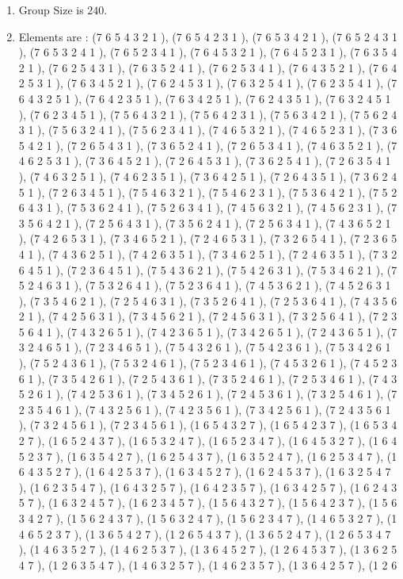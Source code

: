 \documentclass[12pt]{article}
\begin{document}
\begin{enumerate}
\item Group Size is $240$.
\item Elements are : (7 6 5 4 3 2 1  ), (7 6 5 4 2 3 1  ), (7 6 5 3 4 2 1  ), (7 6 5 2 4 3 1  ), (7 6 5 3 2 4 1  ), (7 6 5 2 3 4 1  ), (7 6 4 5 3 2 1  ), (7 6 4 5 2 3 1  ), (7 6 3 5 4 2 1  ), (7 6 2 5 4 3 1  ), (7 6 3 5 2 4 1  ), (7 6 2 5 3 4 1  ), (7 6 4 3 5 2 1  ), (7 6 4 2 5 3 1  ), (7 6 3 4 5 2 1  ), (7 6 2 4 5 3 1  ), (7 6 3 2 5 4 1  ), (7 6 2 3 5 4 1  ), (7 6 4 3 2 5 1  ), (7 6 4 2 3 5 1  ), (7 6 3 4 2 5 1  ), (7 6 2 4 3 5 1  ), (7 6 3 2 4 5 1  ), (7 6 2 3 4 5 1  ), (7 5 6 4 3 2 1  ), (7 5 6 4 2 3 1  ), (7 5 6 3 4 2 1  ), (7 5 6 2 4 3 1  ), (7 5 6 3 2 4 1  ), (7 5 6 2 3 4 1  ), (7 4 6 5 3 2 1  ), (7 4 6 5 2 3 1  ), (7 3 6 5 4 2 1  ), (7 2 6 5 4 3 1  ), (7 3 6 5 2 4 1  ), (7 2 6 5 3 4 1  ), (7 4 6 3 5 2 1  ), (7 4 6 2 5 3 1  ), (7 3 6 4 5 2 1  ), (7 2 6 4 5 3 1  ), (7 3 6 2 5 4 1  ), (7 2 6 3 5 4 1  ), (7 4 6 3 2 5 1  ), (7 4 6 2 3 5 1  ), (7 3 6 4 2 5 1  ), (7 2 6 4 3 5 1  ), (7 3 6 2 4 5 1  ), (7 2 6 3 4 5 1  ), (7 5 4 6 3 2 1  ), (7 5 4 6 2 3 1  ), (7 5 3 6 4 2 1  ), (7 5 2 6 4 3 1  ), (7 5 3 6 2 4 1  ), (7 5 2 6 3 4 1  ), (7 4 5 6 3 2 1  ), (7 4 5 6 2 3 1  ), (7 3 5 6 4 2 1  ), (7 2 5 6 4 3 1  ), (7 3 5 6 2 4 1  ), (7 2 5 6 3 4 1  ), (7 4 3 6 5 2 1  ), (7 4 2 6 5 3 1  ), (7 3 4 6 5 2 1  ), (7 2 4 6 5 3 1  ), (7 3 2 6 5 4 1  ), (7 2 3 6 5 4 1  ), (7 4 3 6 2 5 1  ), (7 4 2 6 3 5 1  ), (7 3 4 6 2 5 1  ), (7 2 4 6 3 5 1  ), (7 3 2 6 4 5 1  ), (7 2 3 6 4 5 1  ), (7 5 4 3 6 2 1  ), (7 5 4 2 6 3 1  ), (7 5 3 4 6 2 1  ), (7 5 2 4 6 3 1  ), (7 5 3 2 6 4 1  ), (7 5 2 3 6 4 1  ), (7 4 5 3 6 2 1  ), (7 4 5 2 6 3 1  ), (7 3 5 4 6 2 1  ), (7 2 5 4 6 3 1  ), (7 3 5 2 6 4 1  ), (7 2 5 3 6 4 1  ), (7 4 3 5 6 2 1  ), (7 4 2 5 6 3 1  ), (7 3 4 5 6 2 1  ), (7 2 4 5 6 3 1  ), (7 3 2 5 6 4 1  ), (7 2 3 5 6 4 1  ), (7 4 3 2 6 5 1  ), (7 4 2 3 6 5 1  ), (7 3 4 2 6 5 1  ), (7 2 4 3 6 5 1  ), (7 3 2 4 6 5 1  ), (7 2 3 4 6 5 1  ), (7 5 4 3 2 6 1  ), (7 5 4 2 3 6 1  ), (7 5 3 4 2 6 1  ), (7 5 2 4 3 6 1  ), (7 5 3 2 4 6 1  ), (7 5 2 3 4 6 1  ), (7 4 5 3 2 6 1  ), (7 4 5 2 3 6 1  ), (7 3 5 4 2 6 1  ), (7 2 5 4 3 6 1  ), (7 3 5 2 4 6 1  ), (7 2 5 3 4 6 1  ), (7 4 3 5 2 6 1  ), (7 4 2 5 3 6 1  ), (7 3 4 5 2 6 1  ), (7 2 4 5 3 6 1  ), (7 3 2 5 4 6 1  ), (7 2 3 5 4 6 1  ), (7 4 3 2 5 6 1  ), (7 4 2 3 5 6 1  ), (7 3 4 2 5 6 1  ), (7 2 4 3 5 6 1  ), (7 3 2 4 5 6 1  ), (7 2 3 4 5 6 1  ), (1 6 5 4 3 2 7  ), (1 6 5 4 2 3 7  ), (1 6 5 3 4 2 7  ), (1 6 5 2 4 3 7  ), (1 6 5 3 2 4 7  ), (1 6 5 2 3 4 7  ), (1 6 4 5 3 2 7  ), (1 6 4 5 2 3 7  ), (1 6 3 5 4 2 7  ), (1 6 2 5 4 3 7  ), (1 6 3 5 2 4 7  ), (1 6 2 5 3 4 7  ), (1 6 4 3 5 2 7  ), (1 6 4 2 5 3 7  ), (1 6 3 4 5 2 7  ), (1 6 2 4 5 3 7  ), (1 6 3 2 5 4 7  ), (1 6 2 3 5 4 7  ), (1 6 4 3 2 5 7  ), (1 6 4 2 3 5 7  ), (1 6 3 4 2 5 7  ), (1 6 2 4 3 5 7  ), (1 6 3 2 4 5 7  ), (1 6 2 3 4 5 7  ), (1 5 6 4 3 2 7  ), (1 5 6 4 2 3 7  ), (1 5 6 3 4 2 7  ), (1 5 6 2 4 3 7  ), (1 5 6 3 2 4 7  ), (1 5 6 2 3 4 7  ), (1 4 6 5 3 2 7  ), (1 4 6 5 2 3 7  ), (1 3 6 5 4 2 7  ), (1 2 6 5 4 3 7  ), (1 3 6 5 2 4 7  ), (1 2 6 5 3 4 7  ), (1 4 6 3 5 2 7  ), (1 4 6 2 5 3 7  ), (1 3 6 4 5 2 7  ), (1 2 6 4 5 3 7  ), (1 3 6 2 5 4 7  ), (1 2 6 3 5 4 7  ), (1 4 6 3 2 5 7  ), (1 4 6 2 3 5 7  ), (1 3 6 4 2 5 7  ), (1 2 6 
\end{enumerate}
\end{document}
